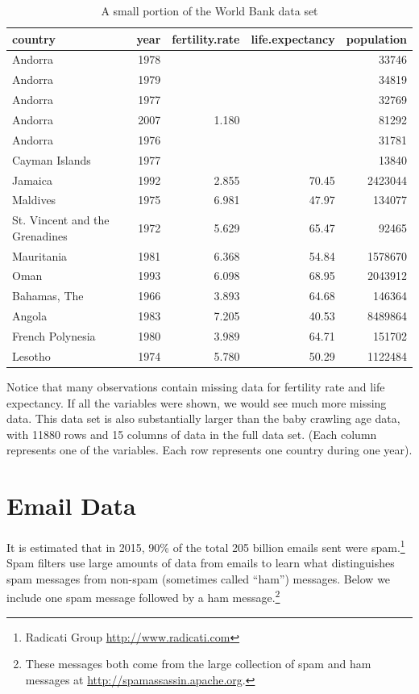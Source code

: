 \documentclass[
]{krantz}
\begin{document}
\begin{table}

\caption{\label{tab:worldBank}A small portion of the World Bank data set}
\centering
\begin{tabular}[t]{lrrrr}
\toprule
country & year & fertility.rate & life.expectancy & population\\
\midrule
Andorra & 1978 &  &  & 33746\\
Andorra & 1979 &  &  & 34819\\
Andorra & 1977 &  &  & 32769\\
Andorra & 2007 & 1.180 &  & 81292\\
Andorra & 1976 &  &  & 31781\\
\addlinespace
Cayman Islands & 1977 &  &  & 13840\\
Jamaica & 1992 & 2.855 & 70.45 & 2423044\\
Maldives & 1975 & 6.981 & 47.97 & 134077\\
St. Vincent and the Grenadines & 1972 & 5.629 & 65.47 & 92465\\
Mauritania & 1981 & 6.368 & 54.84 & 1578670\\
\addlinespace
Oman & 1993 & 6.098 & 68.95 & 2043912\\
Bahamas, The & 1966 & 3.893 & 64.68 & 146364\\
Angola & 1983 & 7.205 & 40.53 & 8489864\\
French Polynesia & 1980 & 3.989 & 64.71 & 151702\\
Lesotho & 1974 & 5.780 & 50.29 & 1122484\\
\bottomrule
\end{tabular}
\end{table}

Notice that many observations contain missing data for fertility rate and life expectancy. If all the variables were shown, we would see much more missing data. This data set is also substantially larger than the baby crawling age data, with 11880 rows and 15 columns of data in the full data set. (Each column represents one of the variables. Each row represents one country during one year).

\hypertarget{email-data}{%
\section{Email Data}\label{email-data}}

It is estimated that in 2015, 90\% of the total 205 billion emails sent were spam.\footnote{Radicati Group \url{http://www.radicati.com}} Spam filters use large amounts of data from emails to learn what distinguishes spam messages from non-spam (sometimes called ``ham'') messages. Below we include one spam message followed by a ham message.\footnote{These messages both come from the large collection of spam and ham messages at \url{http://spamassassin.apache.org}.}
\end{document}
